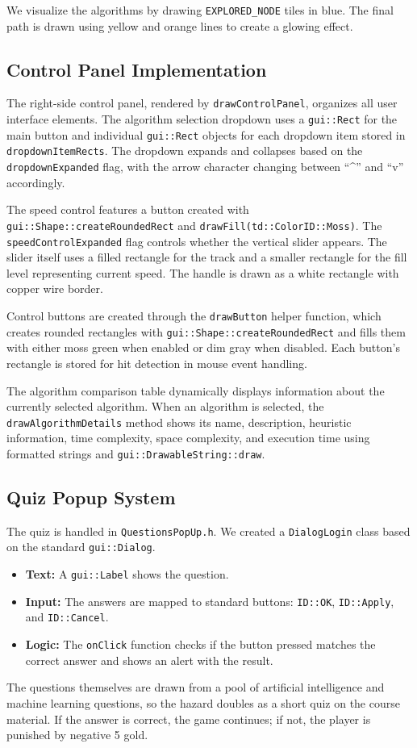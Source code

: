 \documentclass[12pt, a4paper]{article}
\newcommand{\code}[1]{\texttt{#1}}
\begin{document}
We visualize the algorithms by drawing \code{EXPLORED\_NODE} tiles in blue. The final path is drawn using yellow and orange lines to create a glowing effect.

\subsection{Control Panel Implementation}
The right-side control panel, rendered by \code{drawControlPanel}, organizes all user interface elements. The algorithm selection dropdown uses a \code{gui::Rect} for the main button and individual \code{gui::Rect} objects for each dropdown item stored in \code{dropdownItemRects}. The dropdown expands and collapses based on the \code{dropdownExpanded} flag, with the arrow character changing between ``\^{}'' and ``v'' accordingly.

The speed control features a button created with \code{gui::Shape::createRoundedRect} and \code{drawFill(td::ColorID::Moss)}. The \code{speedControlExpanded} flag controls whether the vertical slider appears. The slider itself uses a filled rectangle for the track and a smaller rectangle for the fill level representing current speed. The handle is drawn as a white rectangle with copper wire border.

Control buttons are created through the \code{drawButton} helper function, which creates rounded rectangles with \code{gui::Shape::createRoundedRect} and fills them with either moss green when enabled or dim gray when disabled. Each button's rectangle is stored for hit detection in mouse event handling.

The algorithm comparison table dynamically displays information about the currently selected algorithm. When an algorithm is selected, the \code{drawAlgorithmDetails} method shows its name, description, heuristic information, time complexity, space complexity, and execution time using formatted strings and \code{gui::DrawableString::draw}.

\subsection{Quiz Popup System}
The quiz is handled in \code{QuestionsPopUp.h}. We created a \code{DialogLogin} class based on the standard \code{gui::Dialog}.
\begin{itemize}
    \item \textbf{Text:} A \code{gui::Label} shows the question.
    \item \textbf{Input:} The answers are mapped to standard buttons: \code{ID::OK}, \code{ID::Apply}, and \code{ID::Cancel}.
    \item \textbf{Logic:} The \code{onClick} function checks if the button pressed matches the correct answer and shows an alert with the result.
\end{itemize}
The questions themselves are drawn from a pool of artificial intelligence and machine learning questions, so the hazard doubles as a short quiz on the course material. If the answer is correct, the game continues; if not, the player is punished by negative 5 gold.
\end{document}
